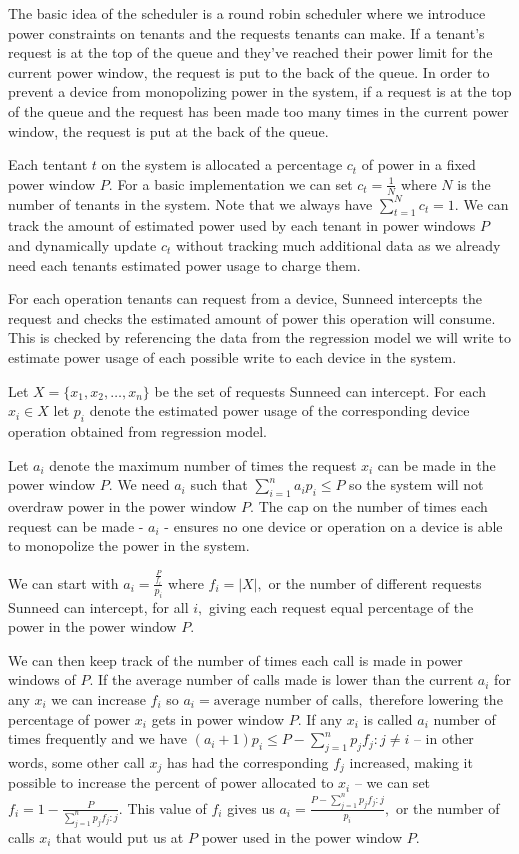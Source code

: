 \documentclass[12pt,english]{amsart}
\begin{document}
The basic idea of the scheduler is a round robin scheduler where we introduce power constraints on tenants and the requests tenants can make. If a tenant's request is at the top of the queue and they've reached their power limit for the current power window, the request is put to the back of the queue. In order to prevent a device from monopolizing power in the system, if a request is at the top of the queue and the request has been made too many times in the current power window, the request is put at the back of the queue.

 Each tentant $t$ on the system is allocated a percentage $c_t$ of power in a fixed power window $P.$ For a basic implementation we can set $c_t = \frac{1}{N}$ where $N$ is the number of tenants in the system. Note that we always have $\sum_{t=1}^Nc_t=1.$ We can track the amount of estimated power used by each tenant in power windows $P$ and dynamically update $c_t$ without tracking much additional data as we already need each tenants estimated power usage to charge them.

For each operation tenants can request from a device, Sunneed intercepts the request and checks the estimated amount of power this operation will consume. This is checked by referencing the data from the regression model we will write to estimate power usage of each possible write to each device in the system.

Let $X = \{x_1,x_2,\ldots,x_n\}$ be the set of requests Sunneed can intercept. For each $x_i \in X$ let $p_i$ denote the estimated power usage of the corresponding device operation obtained from regression model.

Let $a_i$ denote the maximum number of times the request $x_i$ can be made in the power window $P.$ We need $a_i$ such that $\sum_{i=1}^na_ip_i \leq P$ so the system will not overdraw power in the power window $P.$ The cap on the number of times each request can be made - $a_i$ - ensures no one device or operation on a device is able to monopolize the power in the system.

We can start with $a_i = \frac{\frac{P}{f_i}}{p_i}$ where $f_i=|X|,$ or the number of different requests Sunneed can intercept, for all $i,$ giving each request equal percentage of the power in the power window $P.$

 We can then keep track of the number of times each call is made in power windows of $P.$ If the average number of calls made is lower than the current $a_i$ for any $x_i$ we can increase $f_i$ so $a_i = \text{average number of calls},$ therefore lowering the percentage of power $x_i$ gets in power window $P.$ If any $x_i$ is called $a_i$ number of times frequently and we have $(a_i+1)p_i  \leq P - \sum_{j=1}^np_jf_j : j\ne i$ -- in other words, some other call $x_j$ has had the corresponding $f_j$ increased, making it possible to increase the percent of power allocated to $x_i$ -- we can set $f_i = 1-\frac{P}{\sum_{j=1}^np_jf_j : j}.$ This value of $f_i$ gives us $a_i = \frac{P - \sum_{j=1}^np_jf_j : j}{p_i},$ or the number of calls $x_i$ that would put us at $P$ power used in the power window $P.$
 
\end{document}
